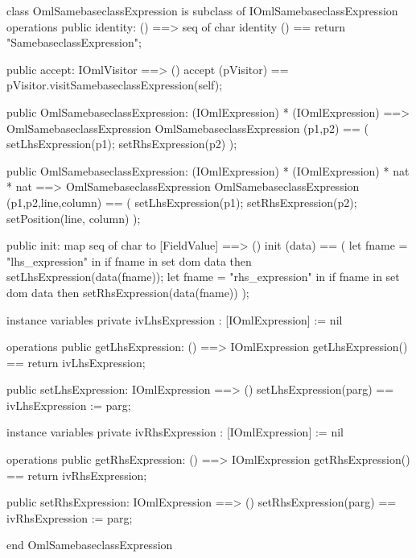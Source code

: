 \begin{vdm_al}
class OmlSamebaseclassExpression is subclass of IOmlSamebaseclassExpression
operations
  public identity: () ==> seq of char
  identity () == return "SamebaseclassExpression";

  public accept: IOmlVisitor ==> ()
  accept (pVisitor) == pVisitor.visitSamebaseclassExpression(self);

  public OmlSamebaseclassExpression:
    (IOmlExpression) *
    (IOmlExpression) ==> OmlSamebaseclassExpression
  OmlSamebaseclassExpression (p1,p2) == 
    ( setLhsExpression(p1);
      setRhsExpression(p2) );

  public OmlSamebaseclassExpression:
    (IOmlExpression) *
    (IOmlExpression) *
    nat *
    nat ==> OmlSamebaseclassExpression
  OmlSamebaseclassExpression (p1,p2,line,column) == 
    ( setLhsExpression(p1);
      setRhsExpression(p2);
      setPosition(line, column) );

  public init: map seq of char to [FieldValue] ==> ()
  init (data) ==
    ( let fname = "lhs_expression" in
        if fname in set dom data
        then setLhsExpression(data(fname));
      let fname = "rhs_expression" in
        if fname in set dom data
        then setRhsExpression(data(fname)) );

instance variables
  private ivLhsExpression : [IOmlExpression] := nil

operations
  public getLhsExpression: () ==> IOmlExpression
  getLhsExpression() == return ivLhsExpression;

  public setLhsExpression: IOmlExpression ==> ()
  setLhsExpression(parg) == ivLhsExpression := parg;

instance variables
  private ivRhsExpression : [IOmlExpression] := nil

operations
  public getRhsExpression: () ==> IOmlExpression
  getRhsExpression() == return ivRhsExpression;

  public setRhsExpression: IOmlExpression ==> ()
  setRhsExpression(parg) == ivRhsExpression := parg;

end OmlSamebaseclassExpression
\end{vdm_al}


